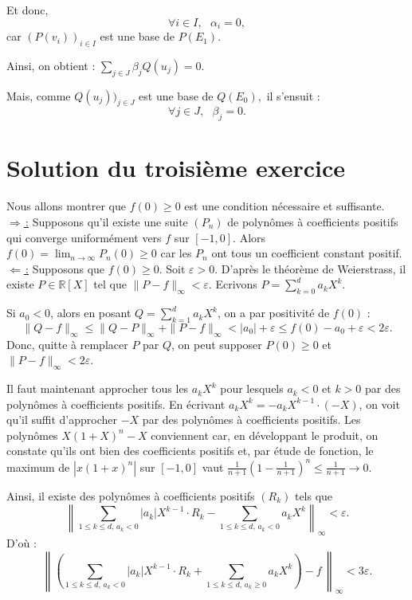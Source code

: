 Et donc, $$\forall i\in I,\mbox{ } \alpha_{i}=0,$$ car $(P(v_{i}))_{i\in I}$ est une base de $P(E_{1}).$

Ainsi, on obtient : $\displaystyle \sum_{j\in J}\beta_{j}Q(u_{j})=0.$

Mais, comme $Q(u_{j}))_{j\in J}$ est une base de $Q(E_{0}),$ il s'ensuit : $$\forall j\in J,\mbox{ } \beta_{j}=0.$$  


\section{Solution du troisième exercice} %

Nous allons montrer que $f(0) \geqslant  0$ est une condition nécessaire et suffisante.\\

\underline{$\Rightarrow $\,:} Supposons qu'il existe une suite $(P_{n} )$ de polynômes à coefficients positifs qui converge uniformément vers $f$ sur $[-1,0]$. Alors $f(0) =\displaystyle \lim _{n\rightarrow \infty } P_{n} (0) \geqslant 0$ car les $P_{n}$ ont tous un coefficient constant positif.\\

\underline{$\Leftarrow$\,:} Supposons que $f(0) \geqslant 0$. Soit $\varepsilon >0$. D'après le théorème de Weierstrass, il existe $P\in \mathbb{R}[X]$ tel que $\|P-f\|_{\infty } <\varepsilon $. Ecrivons $P = \sum_{k=0}^d a_{k} X^{k}$.

Si $a_{0} <0$, alors en posant $Q = \sum_{k=1}^d a_{k} X^{k}$, on a par positivité de $f(0)$ : \[\|Q -f\|_{\infty } \leqslant  \|Q -P\|_{\infty } + \|P-f\|_{\infty } < |a_{0} | +\varepsilon  \leqslant  f(0)-a_{0}  +\varepsilon  < 2\varepsilon .\]
Donc, quitte à remplacer $P$ par $Q$, on peut supposer $P(0) \geqslant 0$ et $\|P-f\|_{\infty } <2\varepsilon $.

Il faut maintenant approcher tous les $a_{k} X^{k}$ pour lesquels $a_{k} <0$ et $k>0$ par des polynômes à coefficients positifs. En écrivant $a_{k} X^{k} = -a_{k} X^{k-1} \cdot (-X)$, on voit qu'il suffit d'approcher $-X$ par des polynômes à coefficients positifs. Les polynômes $X(1+X)^{n} -X$ conviennent car, en développant le produit, on constate qu'ils ont bien des coefficients positifs et, par étude de fonction, le maximum de $|x(1+x)^{n} |$ sur $[-1,0]$ vaut $ \frac{1}{n+1} \left( 1- \frac{1}{n+1} \right)^{n} \leqslant  \frac{1}{n+1} \longrightarrow 0$.

Ainsi, il existe des polynômes à coefficients positifs $(R_{k} )$ tels que
\[\left\|\displaystyle \sum _{1\leqslant k\leqslant d,\,a_{k} <0} |a_{k} |X^{k-1} \cdot R_{k} - \sum _{1\leqslant k\leqslant d,\,a_{k} <0} a_{k} X^{k} \right\|_{\infty } <\varepsilon .\]
D'où : \[\left\| \left( \sum _{1\leqslant k\leqslant d,\,a_{k} <0} |a_{k} |X^{k-1} \cdot R_{k} + \sum _{1\leqslant k\leqslant d,\,a_{k} \geqslant 0} a_{k} X^{k} \right) - f\, \right\|_{\infty } <3\varepsilon .\]